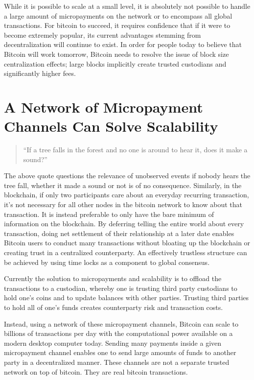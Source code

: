 \documentclass[letterpaper,11pt]{article}
\begin{document}
While it is possible to scale at a small level, it is absolutely not possible to
handle a large amount of micropayments on the network or to encompass all
global transactions. For bitcoin to succeed, it requires confidence that if it
were to become extremely popular, its current advantages stemming from
decentralization will continue to exist. In order for people today to believe
that Bitcoin will work tomorrow, Bitcoin needs to resolve the issue of block
size centralization effects; large blocks implicitly create trusted custodians
and significantly higher fees.

\section{A Network of Micropayment Channels Can Solve Scalability}

\begin{quote}
	``If a tree falls in the forest and no one is around to hear it, does
	it make a sound?''
\end{quote}

The above quote questions the relevance of unobserved events \textemdash if
nobody hears the tree fall, whether it made a sound or not is of no
consequence. Similarly, in the blockchain, if only two participants care about
an everyday recurring transaction, it's not necessary for all other nodes in
the bitcoin network to know about that transaction. It is instead preferable to
only have the bare minimum of information on the blockchain. By deferring
telling the entire world about every transaction, doing net settlement of their
relationship at a later date enables Bitcoin users to conduct many transactions
without bloating up the blockchain or creating trust in a centralized
counterparty. An effectively trustless structure can be achieved by using time
locks as a component to global consensus. 

Currently the solution to micropayments and scalability is to offload the
transactions to a custodian, whereby one is trusting third party custodians to
hold one's coins and to update balances with other parties. Trusting third
parties to hold all of one's funds creates counterparty risk and transaction
costs.

Instead, using a network of these micropayment channels, Bitcoin can scale to
billions of transactions per day with the computational power available on a
modern desktop computer today. Sending many payments inside a given
micropayment channel enables one to send large amounts of funds to another
party in a decentralized manner. These channels are not a separate trusted
network on top of bitcoin. They are real bitcoin transactions.
\end{document}
